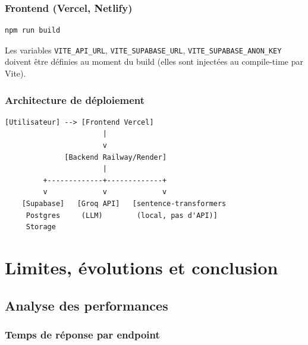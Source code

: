\documentclass[11pt,a4paper]{report}
\begin{document}
\subsection{Frontend (Vercel, Netlify)}

\begin{lstlisting}[language=bash]
npm run build
\end{lstlisting}

Les variables \texttt{VITE\_API\_URL}, \texttt{VITE\_SUPABASE\_URL}, \texttt{VITE\_SUPABASE\_ANON\_KEY} doivent être définies au moment du build (elles sont injectées au compile-time par Vite).

\subsection{Architecture de déploiement}

\begin{lstlisting}[caption={Schéma de déploiement}, language=text]
[Utilisateur] --> [Frontend Vercel]
                       |
                       v
              [Backend Railway/Render]
                       |
         +-------------+-------------+
         v             v             v
    [Supabase]   [Groq API]   [sentence-transformers
     Postgres     (LLM)        (local, pas d'API)]
     Storage
\end{lstlisting}

\chapter{Limites, évolutions et conclusion}

\section{Analyse des performances}

\subsection{Temps de réponse par endpoint}
\end{document}
